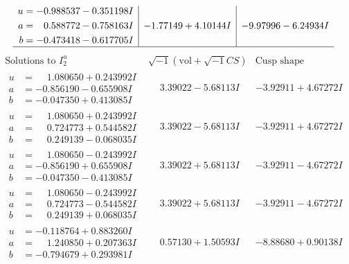 \documentclass[1p]{elsarticle_modified}
\theoremstyle{definition}
\newcommand{\I}{\sqrt{-1}}
\begin{document}
$$\begin{array}{c|c|c}
\begin{aligned}
u &= -0.988537 - 0.351198 I \\
a &= \phantom{-}0.588772 - 0.758163 I \\
b &= -0.473418 - 0.617705 I\end{aligned}
 & -1.77149 + 4.10144 I & -9.97996 - 6.24934 I\\
 \hline 
 \end{array}$$\newpage$$\begin{array}{c|c|c}  
\text{Solutions to }I^u_{2}& \I (\text{vol} + \sqrt{-1}CS) & \text{Cusp shape}\\
 \hline 
\begin{aligned}
u &= \phantom{-}1.080650 + 0.243992 I \\
a &= -0.856190 - 0.655908 I \\
b &= -0.047350 + 0.413085 I\end{aligned}
 & \phantom{-}3.39022 - 5.68113 I & -3.92911 + 4.67272 I \\ \hline\begin{aligned}
u &= \phantom{-}1.080650 + 0.243992 I \\
a &= \phantom{-}0.724773 + 0.544582 I \\
b &= \phantom{-}0.249139 - 0.068035 I\end{aligned}
 & \phantom{-}3.39022 - 5.68113 I & -3.92911 + 4.67272 I \\ \hline\begin{aligned}
u &= \phantom{-}1.080650 - 0.243992 I \\
a &= -0.856190 + 0.655908 I \\
b &= -0.047350 - 0.413085 I\end{aligned}
 & \phantom{-}3.39022 + 5.68113 I & -3.92911 - 4.67272 I \\ \hline\begin{aligned}
u &= \phantom{-}1.080650 - 0.243992 I \\
a &= \phantom{-}0.724773 - 0.544582 I \\
b &= \phantom{-}0.249139 + 0.068035 I\end{aligned}
 & \phantom{-}3.39022 + 5.68113 I & -3.92911 - 4.67272 I \\ \hline\begin{aligned}
u &= -0.118764 + 0.883260 I \\
a &= \phantom{-}1.240850 + 0.207363 I \\
b &= -0.794679 + 0.293981 I\end{aligned}
 & \phantom{-}0.57130 + 1.50593 I & -8.88680 + 0.90138 I \\ \hline\begin{aligned}

\end{aligned}
\end{array}$$
\end{document}
